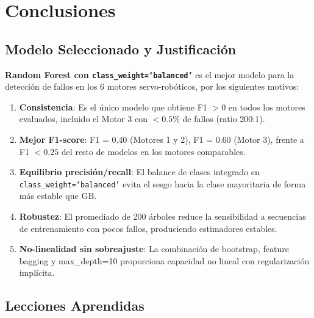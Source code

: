 \documentclass[12pt,a4paper]{article}
\begin{document}
\section{Conclusiones}

\subsection{Modelo Seleccionado y Justificaci\'{o}n}

\textbf{Random Forest con \texttt{class\_weight=`balanced'}} es el mejor modelo para
la detecci\'{o}n de fallos en los 6 motores servo-rob\'{o}ticos, por los siguientes motivos:

\begin{enumerate}[itemsep=4pt]
  \item \textbf{Consistencia}: Es el \'{u}nico modelo que obtiene F1 $> 0$ en todos los
    motores evaluados, incluido el Motor 3 con $< 0.5\%$ de fallos (ratio 200:1).

  \item \textbf{Mejor F1-score}: F1 = 0.40 (Motores 1 y 2), F1 = 0.60 (Motor 3),
    frente a F1 $< 0.25$ del resto de modelos en los motores comparables.

  \item \textbf{Equilibrio precisi\'{o}n/recall}: El balance de clases integrado en
    \texttt{class\_weight=`balanced'} evita el sesgo hacia la clase mayoritaria
    de forma m\'{a}s estable que GB.

  \item \textbf{Robustez}: El promediado de 200 \'{a}rboles reduce la sensibilidad a
    secuencias de entrenamiento con pocos fallos, produciendo estimadores estables.

  \item \textbf{No-linealidad sin sobreajuste}: La combinaci\'{o}n de bootstrap,
    feature bagging y max\_depth=10 proporciona capacidad no lineal con
    regularizaci\'{o}n impl\'{i}cita.
\end{enumerate}

\subsection{Lecciones Aprendidas}
\end{document}
